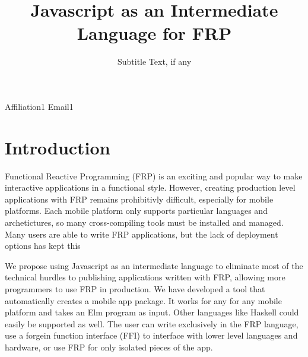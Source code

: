 \documentclass[preprint]{sigplanconf}
\begin{document}
\setlength{\pdfpageheight}{\paperheight}
\setlength{\pdfpagewidth}{\paperwidth}






\title{Javascript as an Intermediate Language for FRP}
\subtitle{Subtitle Text, if any}

           {Affiliation1}
           {Email1}

\maketitle

\section{Introduction}

Functional Reactive Programming (FRP) is an exciting and popular way to make interactive applications in a functional style.
However, creating production level applications with FRP remains prohibitivly difficult, especially for mobile platforms.
Each mobile platform only supports particular languages and archetictures, so many cross-compiling tools must be installed and managed.
Many users are able to write FRP applications, but the lack of deployment options has kept this %

We propose using Javascript as an intermediate language to eliminate most of the technical hurdles to publishing applications written with FRP, allowing more programmers to use FRP in production.
We have developed a tool that automatically creates a mobile app package.
It works for any for any mobile platform and takes an Elm program as input.
Other languages like Haskell could easily be supported as well.
The user can write exclusively in the FRP language, use a forgein function interface (FFI) to interface with lower level languages and hardware, or use FRP for only isolated pieces of the app.
\end{document}
